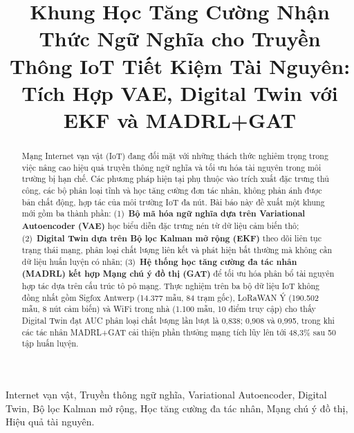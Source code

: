 \documentclass[conference]{IEEEtran}
\begin{document}
\title{Khung Học Tăng Cường Nhận Thức Ngữ Nghĩa cho Truyền Thông
IoT Tiết Kiệm Tài Nguyên:\\
Tích Hợp VAE, Digital Twin với EKF và MADRL+GAT}

\author{
}

\maketitle

\begin{abstract}
Mạng Internet vạn vật (IoT) đang đối mặt với những thách thức
nghiêm trọng trong việc nâng cao hiệu quả truyền thông ngữ nghĩa
và tối ưu hóa tài nguyên trong môi trường bị hạn chế. Các phương
pháp hiện tại phụ thuộc vào trích xuất đặc trưng thủ công, các
bộ phân loại tĩnh và học tăng cường đơn tác nhân, không phản ánh
được bản chất động, hợp tác của môi trường IoT đa nút. Bài báo
này đề xuất một khung mới gồm ba thành phần: (1)~\textbf{Bộ mã
hóa ngữ nghĩa dựa trên Variational Autoencoder (VAE)} học biểu
diễn đặc trưng nén từ dữ liệu cảm biến thô; (2)~\textbf{Digital
Twin dựa trên Bộ lọc Kalman mở rộng (EKF)} theo dõi liên tục
trạng thái mạng, phân loại chất lượng liên kết và phát hiện bất
thường mà không cần dữ liệu huấn luyện có nhãn; (3)~\textbf{Hệ
thống học tăng cường đa tác nhân (MADRL) kết hợp Mạng chú ý đồ
thị (GAT)} để tối ưu hóa phân bổ tài nguyên hợp tác dựa trên
cấu trúc tô pô mạng. Thực nghiệm trên ba bộ dữ liệu IoT không
đồng nhất gồm Sigfox Antwerp (14.377 mẫu, 84 trạm gốc), LoRaWAN
Ý (190.502 mẫu, 8 nút cảm biến) và WiFi trong nhà (1.100 mẫu,
10 điểm truy cập) cho thấy Digital Twin đạt AUC phân loại chất
lượng lần lượt là 0,838; 0,908 và 0,995, trong khi các tác nhân
MADRL+GAT cải thiện phần thưởng mạng tích lũy lên tới 48,3\%
sau 50 tập huấn luyện.
\end{abstract}

\begin{IEEEkeywords}
Internet vạn vật, Truyền thông ngữ nghĩa, Variational Autoencoder,
Digital Twin, Bộ lọc Kalman mở rộng, Học tăng cường đa tác nhân,
Mạng chú ý đồ thị, Hiệu quả tài nguyên.
\end{IEEEkeywords}

\end{document}
